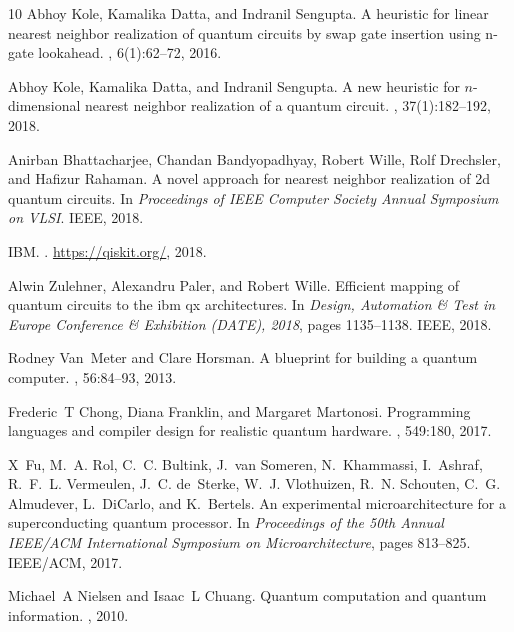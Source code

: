 \documentclass[journal,10pt,twocolumn]{IEEEtran}
\begin{document}
\begin{thebibliography}{10}
Abhoy Kole, Kamalika Datta, and Indranil Sengupta.
\newblock A heuristic for linear nearest neighbor realization of quantum
  circuits by swap gate insertion using n-gate lookahead.
, 6(1):62--72, 2016.

Abhoy Kole, Kamalika Datta, and Indranil Sengupta.
\newblock A new heuristic for $ n $-dimensional nearest neighbor realization of
  a quantum circuit.
, 37(1):182--192, 2018.

Anirban Bhattacharjee, Chandan Bandyopadhyay, Robert Wille, Rolf Drechsler, and
  Hafizur Rahaman.
\newblock A novel approach for nearest neighbor realization of 2d quantum
  circuits.
\newblock In {\em Proceedings of IEEE Computer Society Annual Symposium on
  VLSI}. IEEE, 2018.

{IBM}.
.
\newblock \url{https://qiskit.org/}, 2018.

Alwin Zulehner, Alexandru Paler, and Robert Wille.
\newblock Efficient mapping of quantum circuits to the ibm qx architectures.
\newblock In {\em Design, Automation \& Test in Europe Conference \& Exhibition
  (DATE), 2018}, pages 1135--1138. IEEE, 2018.

Rodney Van~Meter and Clare Horsman.
\newblock A blueprint for building a quantum computer.
, 56:84--93, 2013.

Frederic~T Chong, Diana Franklin, and Margaret Martonosi.
\newblock Programming languages and compiler design for realistic quantum
  hardware.
, 549:180, 2017.

X~Fu, M.~A. Rol, C.~C. Bultink, J.~van Someren, N.~Khammassi, I.~Ashraf,
  R.~F.~L. Vermeulen, J.~C. de~Sterke, W.~J. Vlothuizen, R.~N. Schouten, C.~G.
  Almudever, L.~DiCarlo, and K.~Bertels.
\newblock An experimental microarchitecture for a superconducting quantum
  processor.
\newblock In {\em Proceedings of the 50th Annual IEEE/ACM International
  Symposium on Microarchitecture}, pages 813--825. IEEE/ACM, 2017.

Michael~A Nielsen and Isaac~L Chuang.
\newblock Quantum computation and quantum information.
,
  2010.


\end{thebibliography}
\end{document}
